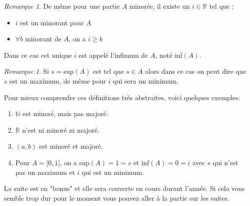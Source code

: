 \documentclass[oneside,12pt,french,table]{book}
\theoremstyle{definition}
\theoremstyle{plain}
\theoremstyle{remark}
\newtheorem{remark}[definition]{Remarque}
\newcommand{\Nn}{{\mathbb{N}}}
\newcommand{\Rr}{{\mathbb{R}}}
\begin{document}
\begin{remark}
    De même pour une partie $A$ minorée, il existe un $i\in \Rr$ tel que :
    \begin{itemize}
    \item $i$ est un minorant pour $A$
    \item$\forall b$ minorant de $A$, on a $i\geq b$
\end{itemize}
    Dans ce cas cet unique $i$ est appelé l'infimum de $A$, noté inf$(A)$.
\end{remark}
\begin{remark}
    Si $s=$sup$(A)$ est tel que $s\in A$ alors dans ce cas on peut dire que $s$ est un maximum, de même pour $i$ qui sera un minimum.  
\end{remark}
Pour mieux comprendre ces définitions très abstraites, voici quelques exemples: 
\begin{enumerate}
\item $\Nn$ est minoré, mais pas majoré. 
\item $\Rr$ n'est ni minoré ni majoré. 
\item $(a,b)$ est minoré et majoré. 
    \item Pour $A=[0,1[$, on a sup$(A)=1=s$ et inf$(A)=0=i$ avec $s$ qui n'est pas un maximum et $i$ qui est un minimum. 
\end{enumerate}
La suite est en "bonus" et elle sera couverte en cours durant l'année. Si cela vous semble trop dur pour le moment vous pouvez aller à la partie sur les suites.
\end{document}
